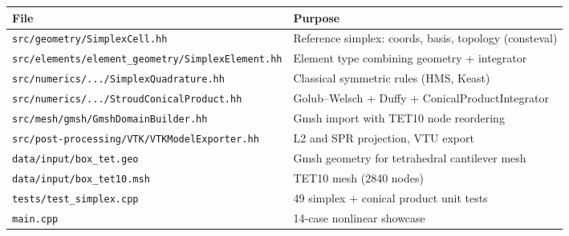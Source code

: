 \begin{center}
\small
\renewcommand{\arraystretch}{1.1}
\begin{tabular}{p{6.8cm}p{7.5cm}}
  \toprule
  File & Purpose \\
  \midrule
  \texttt{src/geometry/SimplexCell.hh}
    & Reference simplex: coords, basis, topology (consteval) \\
  \texttt{src/elements/element\_geometry/SimplexElement.hh}
    & Element type combining geometry + integrator \\
  \texttt{src/numerics/.../SimplexQuadrature.hh}
    & Classical symmetric rules (HMS, Keast) \\
  \texttt{src/numerics/.../StroudConicalProduct.hh}
    & Golub--Welsch + Duffy + ConicalProductIntegrator \\
  \texttt{src/mesh/gmsh/GmshDomainBuilder.hh}
    & Gmsh import with TET10 node reordering \\
  \texttt{src/post-processing/VTK/VTKModelExporter.hh}
    & L2 and SPR projection, VTU export \\
  \texttt{data/input/box\_tet.geo}
    & Gmsh geometry for tetrahedral cantilever mesh \\
  \texttt{data/input/box\_tet10.msh}
    & TET10 mesh (2840 nodes) \\
  \texttt{tests/test\_simplex.cpp}
    & 49 simplex + conical product unit tests \\
  \texttt{main.cpp}
    & 14-case nonlinear showcase \\
  \bottomrule
\end{tabular}
\end{center}
